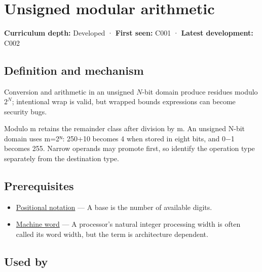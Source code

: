 \hypertarget{appendix-c99977d88b33}{}\label{referencestart:appendix-c99977d88b33}
\section{Unsigned modular arithmetic}\label{appendix-c99977d88b33-unsigned-modular-arithmetic}

\textbf{Curriculum depth:} Developed · \textbf{First seen:} C001 · \textbf{Latest development:} C002

\begin{allmightroledefinition}

\subsection{Definition and mechanism}\label{appendix-c99977d88b33-definition-and-mechanism}

Conversion and arithmetic in an unsigned \(N\)-bit domain produce residues modulo \(2^N\); intentional wrap is valid, but wrapped bounds expressions can become security bugs.

\end{allmightroledefinition}

Modulo m retains the remainder class after division by m. An unsigned N-bit domain uses m=2ᴺ: 250+10 becomes 4 when stored in eight bits, and 0−1 becomes 255. Narrow operands may promote first, so identify the operation type separately from the destination type.

\subsection{Prerequisites}\label{appendix-c99977d88b33-prerequisites}

\begin{itemize}
\tightlist
\item
  \hyperref[appendix-83c3f28f7bda]{Positional notation} --- A base is the number of available digits.
\item
  \hyperref[appendix-d67a19507dc5]{Machine word} --- A processor's natural integer processing width is often called its word width, but the term is architecture dependent.
\end{itemize}

\subsection{Used by}\label{appendix-c99977d88b33-used-by}


